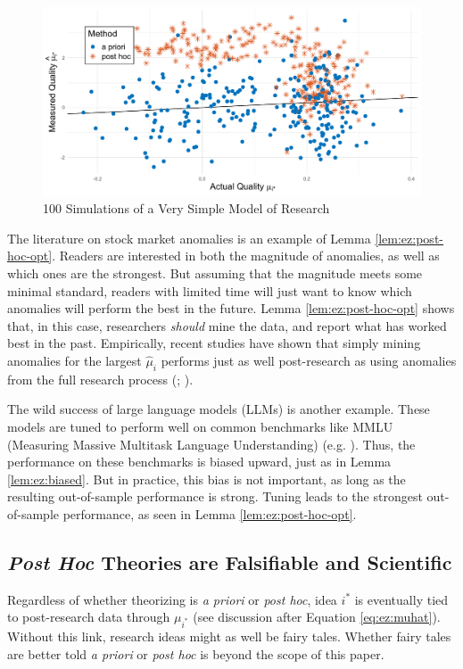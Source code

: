 \documentclass[12pt,english]{article}
\theoremstyle{plain}
\theoremstyle{plain}
\begin{document}
\begin{figure}[htbp]
    \centering
    \includegraphics[width=\textwidth]{../Results/scatter.pdf}
    \caption{100 Simulations of a Very Simple Model of Research}
    \label{fig:ez}
\end{figure}


The literature on stock market anomalies is an example of Lemma \ref{lem:ez:post-hoc-opt}. Readers are interested in both the magnitude of anomalies, as well as which ones are the strongest.  But assuming that the magnitude meets some minimal standard, readers with limited time will just want to know which anomalies will perform the best in the future. Lemma \ref{lem:ez:post-hoc-opt} shows that, in this case, researchers \emph{should} mine the data, and report what has worked best in the past. Empirically, recent studies have shown that simply mining anomalies for the largest $\hat{\mu}_i$ performs just as well post-research as using anomalies from the full research process (\citet{chen2024does}; \citet{chen2023high}).

The wild success of large language models (LLMs) is another example. These models are tuned to perform well on common benchmarks like MMLU (Measuring Massive Multitask Language Understanding) (e.g. \citet{guo2025deepseek}). Thus, the performance on these benchmarks is biased upward, just as in Lemma \ref{lem:ez:biased}. But in practice, this bias is not important, as long as the resulting out-of-sample performance is strong. Tuning leads to the strongest out-of-sample performance, as seen in Lemma \ref{lem:ez:post-hoc-opt}. 


\subsection{\emph{Post Hoc} Theories are Falsifiable and Scientific}

Regardless of whether theorizing is \emph{a priori} or \emph{post hoc}, idea $i^\ast$ is eventually tied to post-research data through $\mu_{i^\ast}$ (see discussion after Equation \eqref{eq:ez:muhat}). Without this link, research ideas might as well be fairy tales. Whether fairy tales are better told \emph{a priori} or \emph{post hoc} is beyond the scope of this paper.
\end{document}
